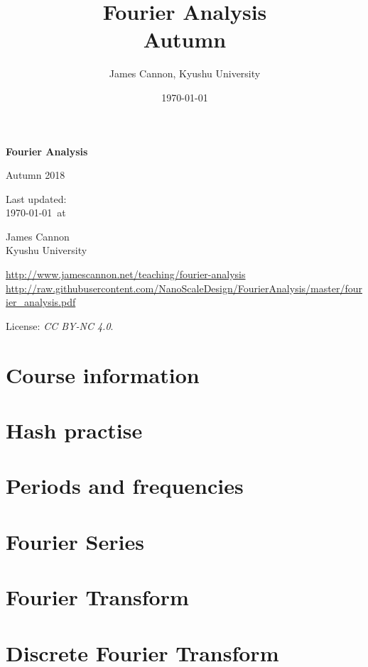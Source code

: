 \documentclass[a4paper]{book} %
\title{Fourier Analysis\\Autumn \courseyear}
\author{James Cannon, Kyushu University}
\date{\today}
\newcommand{\courseyear}{2018 }
\newcommand{\courseurl}{fourier-analysis}
\begin{document}
\begin{titlepage}
    \begin{center}
        \vspace*{1cm}

        \Huge
        \textbf{Fourier Analysis}

        Autumn \courseyear

        \vspace{1.5cm}
        \Large
        Last updated:\\\today \ at \currenttime

        \vspace{4.0cm}
        \LARGE
        James Cannon\\Kyushu University
        \vfill

        \normalsize
        \url{http://www.jamescannon.net/teaching/\courseurl}\\
        \vspace{0.2cm}
        \small
        \url{http://raw.githubusercontent.com/NanoScaleDesign/FourierAnalysis/master/fourier_analysis.pdf}
        \vspace{0.5cm}

        License: \emph{CC BY-NC 4.0}.

    \end{center}
\end{titlepage}

\setcounter{chapter}{-1}

\tableofcontents

\chapter{Course information}
\newpage



%

\chapter{Hash practise}

\chapter{Periods and frequencies}

\chapter{Fourier Series}

\chapter{Fourier Transform}

\chapter{Discrete Fourier Transform}

%
%
\end{document}
